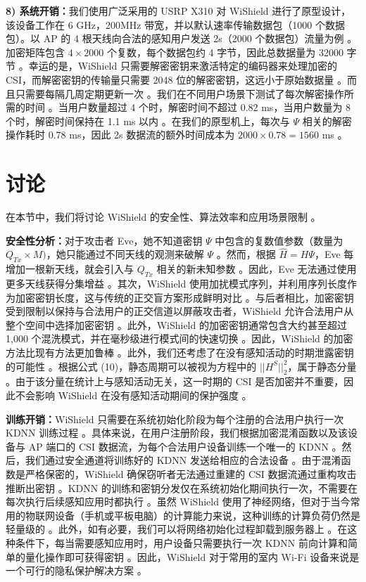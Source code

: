 \documentclass[journal]{IEEEtran}
\begin{document}
\textbf{8) 系统开销：}我们使用广泛采用的 USRP X310 对 WiShield 进行了原型设计，该设备工作在 6 GHz，200MHz 带宽，并以默认速率传输数据包（1000 个数据包）。以 AP 的 4 根天线向合法的感知用户发送 2s（2000 个数据包）流量为例 。加密矩阵包含 $4\times2000$ 个复数，每个数据包约 4 字节，因此总数据量为 32000 字节 。幸运的是，WiShield 只需要解密密钥来激活特定的编码器来处理加密的 CSI，而解密密钥的传输量只需要 2048 位的解密密钥，这远小于原始数据量 。而且只需要每隔几周定期更新一次 。我们在不同用户场景下测试了每次解密操作所需的时间 。当用户数量超过 4 个时，解密时间不超过 0.82 ms，当用户数量为 8 个时，解密时间保持在 1.1 ms 以内 。在我们的原型机上，每次与 $\Psi$ 相关的解密操作耗时 0.78 ms，因此 2s 数据流的额外时间成本为 $2000\times0.78=1560$ ms 。

\section{讨论}
在本节中，我们将讨论 WiShield 的安全性、算法效率和应用场景限制 。

\textbf{安全性分析：}对于攻击者 Eve，她不知道密钥 $\Psi$ 中包含的复数值参数（数量为 $Q_{Tx}\times M)$，她只能通过不同天线的观测来破解 $\Psi$ 。然而，根据 $\hat{H}=H\Psi$，Eve 每增加一根新天线，就会引入与 $Q_{Tx}$ 相关的新未知参数 。因此，Eve 无法通过使用更多天线获得分集增益 。其次，WiShield 使用加扰模式序列，并利用序列长度作为加密密钥长度，这与传统的正交盲方案形成鲜明对比 。与后者相比，加密密钥受到限制以保持与合法用户的正交信道以屏蔽攻击者，WiShield 允许合法用户从整个空间中选择加密密钥 。此外，WiShield 的加密密钥通常包含大约甚至超过 1,000 个混洗模式，并在毫秒级进行模式间的快速切换 。因此，WiShield 的加密方法比现有方法更加鲁棒 。此外，我们还考虑了在没有感知活动的时期泄露密钥的可能性 。根据公式 (10)，静态周期可以被视为方程中的 $||H^{S}||_{2}^{2}$，属于静态分量 。由于该分量在统计上与感知活动无关，这一时期的 CSI 是否加密并不重要，因此不会影响 WiShield 在没有感知活动期间的保护强度 。

\textbf{训练开销：}WiShield 只需要在系统初始化阶段为每个注册的合法用户执行一次 KDNN 训练过程 。具体来说，在用户注册阶段，我们根据加密混淆函数以及该设备与 AP 端口的 CSI 数据流，为每个合法用户设备训练一个唯一的 KDNN 。然后，我们通过安全通道将训练好的 KDNN 发送给相应的合法设备 。由于混淆函数是严格保密的，WiShield 确保窃听者无法通过重建的 CSI 数据流通过重构攻击推断出密钥 。KDNN 的训练和密钥分发仅在系统初始化期间执行一次，不需要在每次执行后续感知应用时都执行 。虽然 WiShield 使用了神经网络，但对于当今常用的物联网设备（手机或平板电脑）的计算能力来说，这种训练的计算负荷仍然是轻量级的 。此外，如有必要，我们可以将网络初始化过程卸载到服务器上 。在这种条件下，每当需要感知应用时，用户设备只需要执行一次 KDNN 前向计算和简单的量化操作即可获得密钥 。因此，WiShield 对于常用的室内 Wi-Fi 设备来说是一个可行的隐私保护解决方案 。
\end{document}
